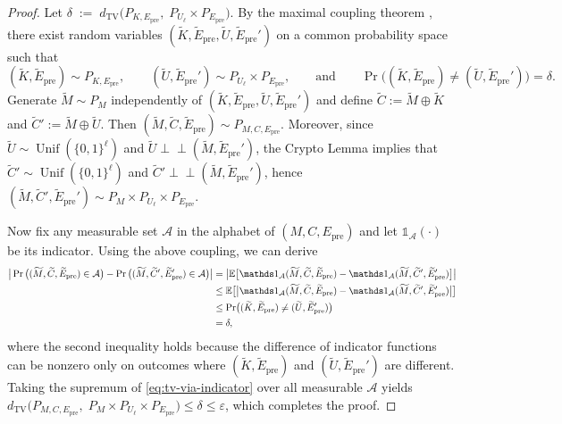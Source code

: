 \documentclass[onecolumn]{IEEEtran} %
\newcommand{\1}{\mathbbm{1}}
\theoremstyle{boldremark}
\DeclareMathOperator{\Unif}{Unif}
\newcommand{\pperp}{\mathrel{\perp\!\!\!\perp}}
\begin{document}
\begin{proof}
Let $\delta \;:=\; d_{\mathrm{TV}}\!\Big(P_{K,E_{\mathrm{pre}}},\;P_{U_\ell}\times P_{E_{\mathrm{pre}}}\Big).$
By the maximal coupling theorem \cite{shaked2007}, there exist random variables
\((\widetilde K,\widetilde E_{\mathrm{pre}},\widetilde U,\widetilde E_{\mathrm{pre}}')\) on a common probability space such that
\[
(\widetilde K,\widetilde E_{\mathrm{pre}})\sim P_{K,E_{\mathrm{pre}}},\qquad
(\widetilde U,\widetilde E_{\mathrm{pre}}')\sim P_{U_\ell}\times P_{E_{\mathrm{pre}}},
\qquad\text{and}\qquad
\Pr\!\big((\widetilde K,\widetilde E_{\mathrm{pre}})\neq(\widetilde U,\widetilde E_{\mathrm{pre}}')\big)=\delta.
\]
Generate \(\widetilde M\sim P_M\) independently of
\((\widetilde K,\widetilde E_{\mathrm{pre}},\widetilde U,\widetilde E_{\mathrm{pre}}')\)
and define
\(\widetilde C:=\widetilde M\oplus \widetilde K\) and
\(\widetilde C':=\widetilde M\oplus \widetilde U\).
Then \((\widetilde M,\widetilde C,\widetilde E_{\mathrm{pre}})\sim P_{M,C,E_{\mathrm{pre}}}\).
Moreover, since \(\widetilde U\sim \Unif(\{0,1\}^\ell)\) and \(\widetilde U\pperp(\widetilde M,\widetilde E_{\mathrm{pre}}')\),
the Crypto Lemma implies that \(\widetilde C'\sim \Unif(\{0,1\}^\ell)\) and
\(\widetilde C'\pperp(\widetilde M,\widetilde E_{\mathrm{pre}}')\), hence
\((\widetilde M,\widetilde C',\widetilde E_{\mathrm{pre}}')\sim P_M\times P_{U_\ell}\times P_{E_{\mathrm{pre}}}\).

Now fix any measurable set \(\mathcal A\) in the alphabet of \((M,C,E_{\mathrm{pre}})\) and let \(\mathds 1_{\mathcal A}(\cdot)\)
be its indicator. Using the above coupling, we can derive
\begin{align}
\big|\Pr\big((\widetilde M,\widetilde C,\widetilde E_{\mathrm{pre}})\in\mathcal A\big)
-\Pr\big((\widetilde M,\widetilde C',\widetilde E_{\mathrm{pre}}')\in\mathcal A\big)\big|
&=\big|\mathbb E\big[\mathds 1_{\mathcal A}(\widetilde M,\widetilde C,\widetilde E_{\mathrm{pre}})
-\mathds 1_{\mathcal A}(\widetilde M,\widetilde C',\widetilde E_{\mathrm{pre}}')\big]\big|\notag\\
&\le \mathbb E\big[\big|\mathds 1_{\mathcal A}(\widetilde M,\widetilde C,\widetilde E_{\mathrm{pre}})
-\mathds 1_{\mathcal A}(\widetilde M,\widetilde C',\widetilde E_{\mathrm{pre}}')\big|\big]\notag\\
&\le \Pr\!\big((\widetilde K,\widetilde E_{\mathrm{pre}})\neq(\widetilde U,\widetilde E_{\mathrm{pre}}')\big)\notag\\
&=\delta,\label{eq:tv-via-indicator}
\end{align}
where the second inequality holds because the difference of indicator functions can be nonzero only on outcomes where
\((\widetilde K,\widetilde E_{\mathrm{pre}})\) and \((\widetilde U,\widetilde E_{\mathrm{pre}}')\) are different.
Taking the supremum of \eqref{eq:tv-via-indicator} over all measurable \(\mathcal A\) yields
\(d_{\mathrm{TV}}\!\big(P_{M,C,E_{\mathrm{pre}}},\;P_M\times P_{U_\ell}\times P_{E_{\mathrm{pre}}}\big)\le \delta \le \varepsilon\),
which completes the proof.
\end{proof}
\end{document}
